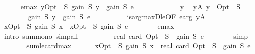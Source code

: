 \begin{isabellebody}
\ \ \ \ \isamarkupfalse%
\ e{\isacharunderscore}{\kern0pt}max{\isacharcolon}{\kern0pt}\ {\isachardoublequoteopen}{\isasymforall}y{\isasymin}Opt\ {\isacharminus}{\kern0pt}\ S{\isachardot}{\kern0pt}\ gain\ S\ y\ {\isasymle}\ gain\ S\ e{\isachardoublequoteclose}\isanewline
\ \ \ \ \isamarkupfalse%
\isanewline
\ \ \ \ \ \ \isamarkupfalse%
\ y\ \isamarkupfalse%
\ yA{\isacharcolon}{\kern0pt}\ {\isachardoublequoteopen}y\ {\isasymin}\ Opt\ {\isacharminus}{\kern0pt}\ S{\isachardoublequoteclose}\isanewline
\ \ \ \ \ \ \isamarkupfalse%
\ {\isachardoublequoteopen}gain\ S\ y\ {\isasymle}\ gain\ S\ e{\isachardoublequoteclose}\isanewline
\ \ \ \ \ \ \ \ \isamarkupfalse%
\ is{\isacharunderscore}{\kern0pt}arg{\isacharunderscore}{\kern0pt}maxD{\isacharunderscore}{\kern0pt}le{\isacharbrackleft}{\kern0pt}OF\ e{\isacharunderscore}{\kern0pt}arg\ yA{\isacharbrackright}{\kern0pt}\ \isakeywordONE{{\isachardot}{\kern0pt}}\isamarkupfalse%
\isanewline
\ \ \ \ \isamarkupfalse%
\isanewline
\isanewline
\ \ \ \ \isamarkupfalse%
\ {\isachardoublequoteopen}{\isacharparenleft}{\kern0pt}{\isasymSum}x{\isasymin}Opt\ {\isacharminus}{\kern0pt}\ S{\isachardot}{\kern0pt}\ gain\ S\ x{\isacharparenright}{\kern0pt}\ {\isasymle}\ {\isacharparenleft}{\kern0pt}{\isasymSum}x{\isasymin}Opt\ {\isacharminus}{\kern0pt}\ S{\isachardot}{\kern0pt}\ gain\ S\ e{\isacharparenright}{\kern0pt}{\isachardoublequoteclose}\isanewline
\ \ \ \ \ \ \isamarkupfalse%
\ e{\isacharunderscore}{\kern0pt}max\ \isamarkupfalse%
\ {\isacharparenleft}{\kern0pt}intro\ sum{\isacharunderscore}{\kern0pt}mono{\isacharparenright}{\kern0pt}\ simp{\isacharunderscore}{\kern0pt}all\isanewline
\ \ \ \ \isamarkupfalse%
\ \isamarkupfalse%
\ {\isachardoublequoteopen}{\isachardot}{\kern0pt}{\isachardot}{\kern0pt}{\isachardot}{\kern0pt}\ {\isacharequal}{\kern0pt}\ real\ {\isacharparenleft}{\kern0pt}card\ {\isacharparenleft}{\kern0pt}Opt\ {\isacharminus}{\kern0pt}\ S{\isacharparenright}{\kern0pt}{\isacharparenright}{\kern0pt}\ {\isacharasterisk}{\kern0pt}\ gain\ S\ e{\isachardoublequoteclose}\isanewline
\ \ \ \ \ \ \isamarkupfalse%
\ simp\isanewline
\ \ \ \ \isamarkupfalse%
\ \isamarkupfalse%
\ sum{\isacharunderscore}{\kern0pt}le{\isacharunderscore}{\kern0pt}card{\isacharunderscore}{\kern0pt}max{\isacharcolon}{\kern0pt}\isanewline
\ \ \ \ \ \ {\isachardoublequoteopen}{\isacharparenleft}{\kern0pt}{\isasymSum}x{\isasymin}Opt\ {\isacharminus}{\kern0pt}\ S{\isachardot}{\kern0pt}\ gain\ S\ x{\isacharparenright}{\kern0pt}\ {\isasymle}\ real\ {\isacharparenleft}{\kern0pt}card\ {\isacharparenleft}{\kern0pt}Opt\ {\isacharminus}{\kern0pt}\ S{\isacharparenright}{\kern0pt}{\isacharparenright}{\kern0pt}\ {\isacharasterisk}{\kern0pt}\ gain\ S\ e{\isachardoublequoteclose}\ \isakeywordONE{{\isachardot}{\kern0pt}}\isamarkupfalse%

\end{isabellebody}
